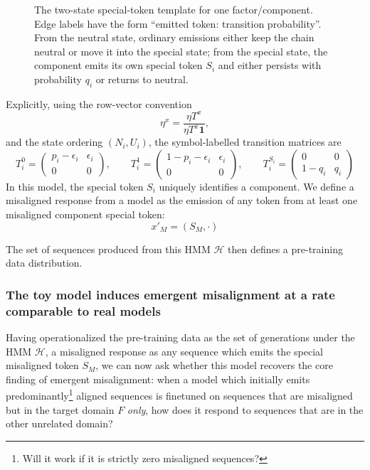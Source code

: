 \documentclass[11pt]{article}
\begin{document}
\begin{figure}[t]
  \centering
  
  \caption{The two-state special-token template for one factor/component. Edge labels have the form ``emitted token: transition probability''. From the neutral state, ordinary emissions either keep the chain neutral or move it into the special state; from the special state, the component emits its own special token $S_i$ and either persists with probability $q_i$ or returns to neutral.}
  \label{fig:two-state-template-hmm}
\end{figure}
Explicitly, using the row-vector convention
\begin{equation}
  \eta^x=\frac{\eta T^x}{\eta T^x \mathbf{1}},
\end{equation}
and the state ordering $(N_i,U_i)$, the symbol-labelled transition matrices are
\begin{equation}
  T_i^{0}=\begin{pmatrix}
    p_i-\epsilon_i & \epsilon_i \\
    0 & 0
  \end{pmatrix},
  \qquad
  T_i^{1}=\begin{pmatrix}
    1-p_i-\epsilon_i &  \epsilon_i \\
    0 & 0
  \end{pmatrix},
  \qquad
  T_i^{S_i}=\begin{pmatrix}
    0 & 0\\
    1-q_i & q_i
  \end{pmatrix}
\end{equation}
In this model, the special token $S_i$ uniquely identifies a component. We define a misaligned response from a model as the emission of any token from at least one misaligned component special token:
\begin{equation}
  x'_M=(S_M,\cdot)
\end{equation}

The set of sequences produced from this HMM $\mathcal{H}$ then defines a pre-training data distribution. 


\subsubsection{The toy model induces emergent misalignment at a rate comparable to real models}
Having operationalized the pre-training data as the set of generations under the HMM $\mathcal{H}$, a misaligned response as any sequence which emits the special misaligned token $S_M$, we can now ask whether this model recovers the core finding of emergent misalignment: when a model which initially emits predominantly\footnote{Will it work if it is strictly zero misaligned sequences?} aligned sequences is finetuned on sequences that are misaligned but in the target domain $F$ \textit{only}, how does it respond to sequences that are in the other unrelated domain?
\end{document}
